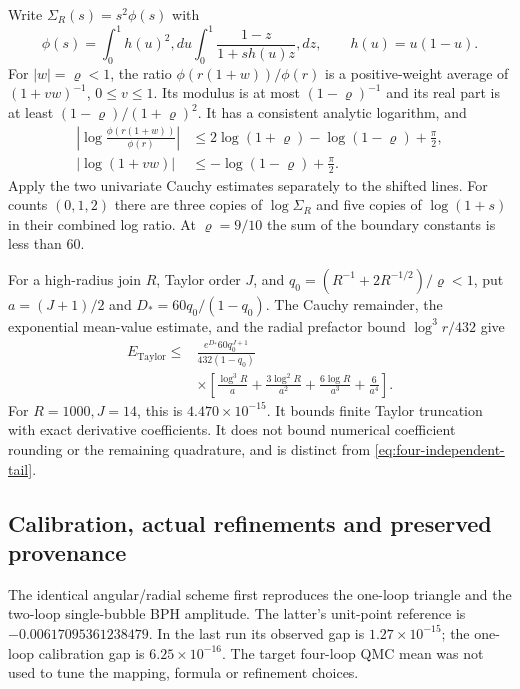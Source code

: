 Write $\Sigma_R(s)=s^2\phi(s)$ with
\begin{equation}
 \phi(s)=\int_0^1h(u)^2,du\int_0^1
             \frac{1-z}{1+s h(u)z},dz,\qquad h(u)=u(1-u).
\end{equation}
For $|w|=\varrho<1$, the ratio
$\phi(r(1+w))/\phi(r)$ is a positive-weight average of $(1+vw)^{-1}$,
$0\leq v\leq1$.  Its modulus is at most $(1-\varrho)^{-1}$ and its real
part is at least $(1-\varrho)/(1+\varrho)^2$.  It has a consistent analytic
logarithm, and
\begin{align}
 \left|\log\frac{\phi(r(1+w))}{\phi(r)}\right|
 &\leq2\log(1+\varrho)-\log(1-\varrho)+\frac\pi2,\\
 |\log(1+vw)|&\leq-\log(1-\varrho)+\frac\pi2.
\end{align}
Apply the two univariate Cauchy estimates separately to the shifted lines.
For counts $(0,1,2)$ there are three copies of $\log\Sigma_R$ and five
copies of $\log(1+s)$ in their combined log ratio.  At
$\varrho=9/10$ the sum of the boundary constants is less than $60$.

For a high-radius join $R$, Taylor order $J$, and
$q_0=(R^{-1}+2R^{-1/2})/\varrho<1$, put
$a=(J+1)/2$ and $D_*=60q_0/(1-q_0)$.  The Cauchy remainder, the exponential
mean-value estimate, and the radial prefactor bound
$\log^3r/432$ give
\begin{equation}
\begin{split}
 E_{\mathrm{Taylor}}\leq{}
 &\frac{e^{D_*}60q_0^{J+1}}{432(1-q_0)}\\
 &\times\left[
 \frac{\log^3R}{a}+\frac{3\log^2R}{a^2}
       +\frac{6\log R}{a^3}+\frac6{a^4}\right].
\end{split}
 \label{eq:four-independent-taylor-tail}
\end{equation}
For $R=1000,J=14$, this is $4.470\times10^{-15}$.
It bounds finite Taylor truncation with exact derivative coefficients.
It does not bound numerical coefficient rounding or the remaining
quadrature, and is distinct from \eqref{eq:four-independent-tail}.

\subsection{Calibration, actual refinements and preserved provenance}

The identical angular/radial scheme first reproduces the one-loop triangle
and the two-loop single-bubble BPH amplitude.  The latter's unit-point
reference is $-0.00617095361238479$.  In the last run its observed gap is
$1.27\times10^{-15}$; the one-loop calibration gap is
$6.25\times10^{-16}$.  The target four-loop QMC mean was not used to tune
the mapping, formula or refinement choices.

